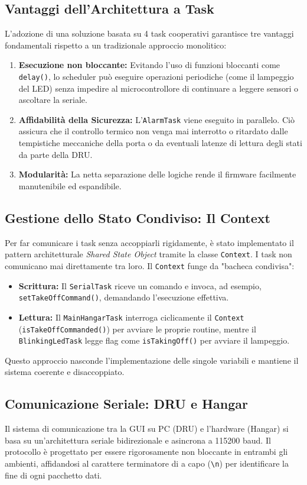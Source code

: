 \documentclass[12pt, a4paper]{article}
\begin{document}
\subsection{Vantaggi dell'Architettura a Task}
L'adozione di una soluzione basata su 4 task cooperativi garantisce tre vantaggi fondamentali rispetto a un tradizionale approccio monolitico:
\begin{enumerate}
    \item \textbf{Esecuzione non bloccante:} Evitando l'uso di funzioni bloccanti come \texttt{delay()}, lo scheduler può eseguire operazioni periodiche (come il lampeggio del LED) senza impedire al microcontrollore di continuare a leggere sensori o ascoltare la seriale.
    \item \textbf{Affidabilità della Sicurezza:} L'\texttt{AlarmTask} viene eseguito in parallelo. Ciò assicura che il controllo termico non venga mai interrotto o ritardato dalle tempistiche meccaniche della porta o da eventuali latenze di lettura degli stati da parte della DRU.
    \item \textbf{Modularità:} La netta separazione delle logiche rende il firmware facilmente manutenibile ed espandibile.
\end{enumerate}

\subsection{Gestione dello Stato Condiviso: Il Context}
Per far comunicare i task senza accoppiarli rigidamente, è stato implementato il pattern architetturale \textit{Shared State Object} tramite la classe \texttt{Context}. I task non comunicano mai direttamente tra loro. Il \texttt{Context} funge da "bacheca condivisa":
\begin{itemize}
    \item \textbf{Scrittura:} Il \texttt{SerialTask} riceve un comando e invoca, ad esempio, \texttt{setTakeOffCommand()}, demandando l'esecuzione effettiva.
    \item \textbf{Lettura:} Il \texttt{MainHangarTask} interroga ciclicamente il \texttt{Context} (\texttt{isTakeOffCommanded()}) per avviare le proprie routine, mentre il \texttt{BlinkingLedTask} legge flag come \texttt{isTakingOff()} per avviare il lampeggio.
\end{itemize}
Questo approccio nasconde l'implementazione delle singole variabili e mantiene il sistema coerente e disaccoppiato.

\subsection{Comunicazione Seriale: DRU e Hangar}
Il sistema di comunicazione tra la GUI su PC (DRU) e l'hardware (Hangar) si basa su un'architettura seriale bidirezionale e asincrona a 115200 baud. Il protocollo è progettato per essere rigorosamente non bloccante in entrambi gli ambienti, affidandosi al carattere terminatore di a capo (\texttt{\textbackslash n}) per identificare la fine di ogni pacchetto dati.
\end{document}
